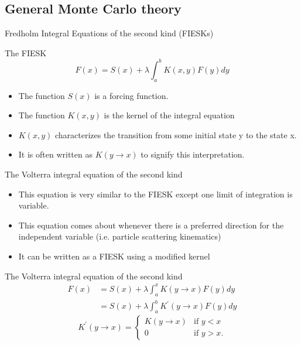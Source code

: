 \documentclass{beamer}
\begin{document}
\subsection{General Monte Carlo theory}
\begin{frame}{Fredholm Integral Equations of the second kind (FIESKs)}

  \begin{beamerboxesrounded}{The FIESK}
    \begin{equation*}
      F(x) = S(x) + \lambda \int_a^b K(x,y) F(y)dy
      \label{eq:fredholm_int_eqn}
    \end{equation*}
  \end{beamerboxesrounded}
  
  \begin{itemize}
    \item The function $S(x)$ is a forcing function.
    \item The function $K(x,y)$ is the kernel of the integral equation
    \item $K(x,y)$ characterizes the transition from some initial state y to
      the state x.
    \item It is often written as $K(y \to x)$ to signify this interpretation.
  \end{itemize}
  
\end{frame}

\begin{frame}{The Volterra integral equation of the second kind}
  
  \begin{itemize}
    \item This equation is very similar to the FIESK except one limit of 
      integration is variable.
    \item This equation comes about whenever there is a preferred direction for 
      the independent variable (i.e. particle scattering kinematics)
    \item It can be written as a FIESK using a modified kernel
  \end{itemize}

  \begin{beamerboxesrounded}{The Volterra integral equation of the second kind}
    \begin{align}
      F(x) & = S(x) + \lambda \int_a^x K(y \to x) F(y) dy
      \nonumber \\
      & = S(x) + \lambda \int_a^b K^{'}(y \to x) F(y) dy \nonumber
    \end{align}
    \begin{equation*}
      K^{'}(y \to x) = 
      \begin{cases}
        K(y \to x) & \text{if }y < x \\
        0 & \text{if }y > x.
      \end{cases}
    \end{equation*}
  \end{beamerboxesrounded}

\end{frame}
\end{document}
